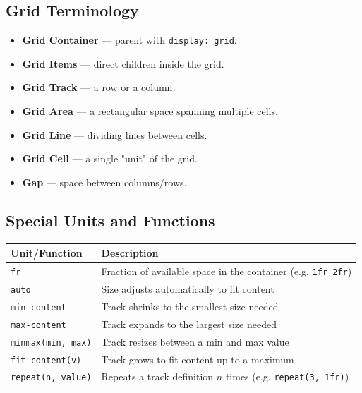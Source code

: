 \documentclass[12pt]{article}
\begin{document}
\subsection{Grid Terminology}
\begin{itemize}
    \item \textbf{Grid Container} — parent with \texttt{display: grid}.
    \item \textbf{Grid Items} — direct children inside the grid.
    \item \textbf{Grid Track} — a row or a column.
    \item \textbf{Grid Area} — a rectangular space spanning multiple cells.
    \item \textbf{Grid Line} — dividing lines between cells.
    \item \textbf{Grid Cell} — a single "unit" of the grid.
    \item \textbf{Gap} — space between columns/rows.
\end{itemize}

\subsection{Special Units and Functions}
\begin{center}
\begin{tabular}{ll}
\textbf{Unit/Function} & \textbf{Description} \\
\hline
\texttt{fr} & Fraction of available space in the container (e.g. \texttt{1fr 2fr}) \\
\texttt{auto} & Size adjusts automatically to fit content \\
\texttt{min-content} & Track shrinks to the smallest size needed \\
\texttt{max-content} & Track expands to the largest size needed \\
\texttt{minmax(min, max)} & Track resizes between a min and max value \\
\texttt{fit-content(v)} & Track grows to fit content up to a maximum \\
\texttt{repeat(n, value)} & Repeats a track definition $n$ times (e.g. \texttt{repeat(3, 1fr)}) \\
\end{tabular}
\end{center}
\end{document}
